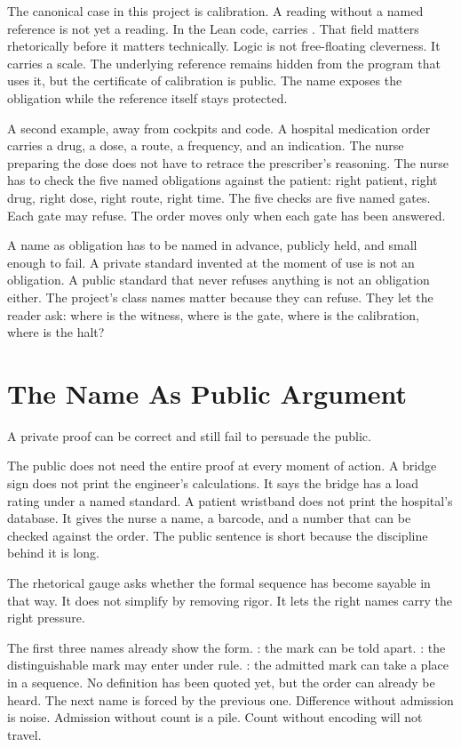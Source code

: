 The canonical case in this project is calibration. A reading without a named
reference is not yet a reading. In the Lean code,  carries
. That field matters rhetorically before it
matters technically. Logic is not free-floating cleverness. It carries a
scale. The underlying reference remains hidden from the program that uses it,
but the certificate of calibration is public. The name exposes the obligation
while the reference itself stays protected.

A second example, away from cockpits and code. A hospital medication order
carries a drug, a dose, a route, a frequency, and an indication. The nurse
preparing the dose does not have to retrace the prescriber's reasoning. The
nurse has to check the five named obligations against the patient: right
patient, right drug, right dose, right route, right time. The five checks
are five named gates. Each gate may refuse. The order moves only when each
gate has been answered.

A name as obligation has to be named in advance, publicly held, and small
enough to fail. A private standard invented at the moment of use is not an
obligation. A public standard that never refuses anything is not an
obligation either. The project's class names matter because they can refuse.
They let the reader ask: where is the witness, where is the gate, where is
the calibration, where is the halt?

\section{The Name As Public Argument}
\label{se:the-name-as-public-argument}

A private proof can be correct and still fail to persuade the public.

The public does not need the entire proof at every moment of action. A bridge
sign does not print the engineer's calculations. It says the bridge has a
load rating under a named standard. A patient wristband does not print the
hospital's database. It gives the nurse a name, a barcode, and a number that
can be checked against the order. The public sentence is short because the
discipline behind it is long.

The rhetorical gauge asks whether the formal sequence has become sayable in
that way. It does not simplify by removing rigor. It lets the right names
carry the right pressure.

The first three names already show the form. : the
mark can be told apart. : the distinguishable mark may
enter under rule. : the admitted mark can take a place in a
sequence. No definition has been quoted yet, but the order can already be
heard. The next name is forced by the previous one. Difference without
admission is noise. Admission without count is a pile. Count without
encoding will not travel.

